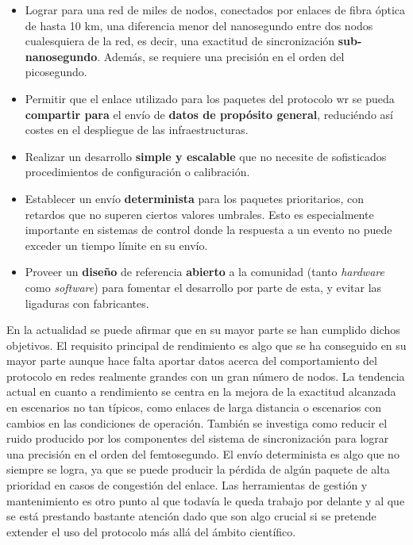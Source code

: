 \begin{itemize}
	\item Lograr para una red de miles de nodos, conectados por enlaces de 
	fibra óptica de hasta 10 km, una diferencia menor del nanosegundo entre dos 
	nodos cualesquiera de la red, es decir, una exactitud de sincronización 
	\textbf{sub-nanosegundo}. Además, se requiere una precisión en el orden del 
	picosegundo.
	
	\item Permitir que el enlace utilizado para los paquetes del protocolo 
	\gls{wr} se pueda \textbf{compartir para} el envío de \textbf{datos de 
	propósito general}, 
	reduciéndo así costes en el despliegue de las infraestructuras.
	
	\item Realizar un desarrollo \textbf{simple y escalable} que no necesite de 
	sofisticados procedimientos de configuración o calibración.
	
	\item Establecer un envío \textbf{determinista} para los paquetes 
	prioritarios, con 
	retardos que no superen ciertos valores umbrales. Esto es especialmente 
	importante en sistemas de control donde la respuesta a un evento no puede 
	exceder un tiempo límite en su envío.
	
	\item Proveer un \textbf{diseño} de referencia \textbf{abierto} a la 
	comunidad 
	(tanto \textit{hardware} como \textit{software}) para fomentar el 
	desarrollo por parte de esta, y evitar las ligaduras con fabricantes.
\end{itemize}

En la actualidad se puede afirmar que en su mayor parte se han cumplido dichos 
objetivos. El requisito principal de rendimiento es algo que se ha conseguido 
en su mayor parte aunque hace falta aportar datos acerca del comportamiento del 
protocolo en redes realmente grandes con un gran número de nodos. La tendencia 
actual en cuanto a rendimiento se centra en la mejora de la exactitud alcanzada 
en escenarios no tan típicos, como enlaces de larga distancia o escenarios con 
cambios en las condiciones de operación. También se investiga como reducir el 
ruido producido por los componentes del sistema de sincronización para lograr 
una precisión en el orden del femtosegundo. El envío determinista es algo que 
no siempre se logra, ya que se puede producir la pérdida de algún paquete de 
alta prioridad en casos de congestión del enlace. Las herramientas de gestión y 
mantenimiento es otro punto al que todavía le queda trabajo por delante y al 
que se está prestando bastante atención dado que son algo crucial si se 
pretende extender el uso del protocolo más allá del ámbito científico.

